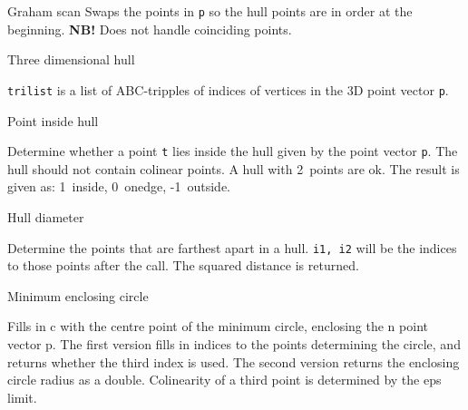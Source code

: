 
\begin{algorithm}{Graham scan}
\desc
Swaps the points in {\tt p} so the hull points are in order at the
beginning.  {\bf NB!} Does not handle coinciding points.
\end{algorithm}


\begin{algorithm}{Three dimensional hull}


\desc
{\tt trilist} is a list of ABC-tripples of indices of vertices in the 3D
point vector {\tt p}.
\end{algorithm}


\begin{algorithm}{Point inside hull}

\desc
Determine whether a point {\tt t} lies inside the hull given by the
point vector {\tt p}. The hull should not contain colinear points. A hull with
2~points are ok. The result is given as: 1~inside, 0~onedge, -1~outside.
\end{algorithm}


\begin{algorithm}{Hull diameter}

\desc
Determine the points that are farthest apart in a hull.
{\tt i1, i2} will be the indices to those points after the call.
The squared distance is returned.
\end{algorithm}


\begin{algorithm}{Minimum enclosing circle}

\desc
Fills in c with the centre point of the minimum circle, enclosing the
n point vector p. The first version fills in indices to the points
determining the circle, and returns whether the third index is used.
The second version returns the enclosing circle radius as a double.
Colinearity of a third point is determined by the eps limit.
\end{algorithm}

